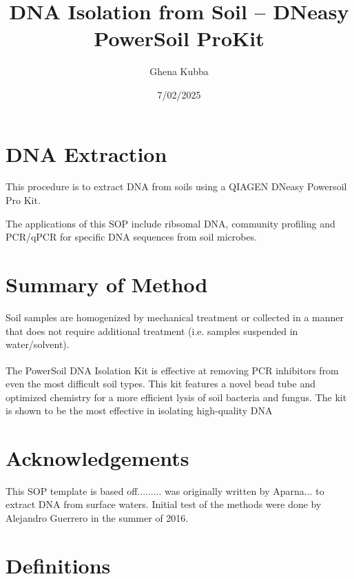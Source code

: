 \documentclass[12pt]{SOP5_beta}\usepackage[]{graphicx}\usepackage[]{xcolor}
\title{DNA Isolation from Soil -- DNeasy PowerSoil ProKit}
\date{7/02/2025}
\author{Ghena Kubba}
\begin{document}
\maketitle

\section{DNA Extraction }

\NP This procedure is to extract DNA from soils using a QIAGEN DNeasy Powersoil Pro Kit. 

\NP The applications of this SOP include ribsomal DNA, community profiling and PCR/qPCR for specific DNA sequences from soil microbes. 

\section{Summary of Method}

Soil samples are homogenized by mechanical treatment or collected in a manner that does not require additional treatment (i.e. samples suspended in water/solvent). 

The PowerSoil\textsuperscript{\textregistered} DNA Isolation Kit is effective at removing PCR inhibitors from even the most difficult soil types. This kit features a novel bead tube and optimized chemistry for a more efficient lysis of soil bacteria and fungus. The kit is shown to be the most effective in isolating high-quality DNA

\tableofcontents

\newpage

\section{Acknowledgements}

\NP This SOP template is based off.........
was originally written by Aparna... to extract DNA from surface waters. Initial test of the methods were done by Alejandro Guerrero in the summer of 2016. 

\section{Definitions}
\end{document}
